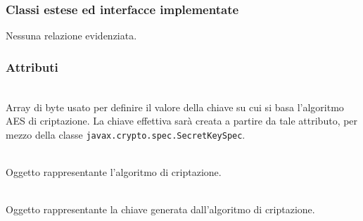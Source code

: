 \subsubsection*{Classi estese ed interfacce implementate}

Nessuna relazione evidenziata.

\subsubsection*{Attributi}
\begin{description}
  \item{}\\
  Array di byte usato per definire il valore della chiave su cui si basa l'algoritmo AES di criptazione. La chiave effettiva sarà creata a partire da tale attributo, per mezzo della classe \texttt{javax.crypto.spec.SecretKeySpec}.
  \item{}\\
  Oggetto rappresentante l'algoritmo di criptazione.
  \item{}\\
  Oggetto rappresentante la chiave generata dall'algoritmo di criptazione.
\end{description}

